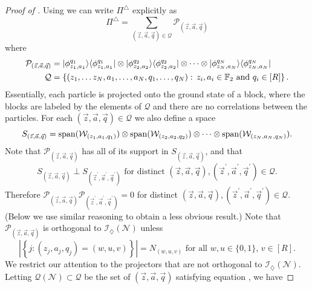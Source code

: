 \documentclass[../thesis-main/thesis-main]{subfiles}
\begin{document}
\begin{proof}[Proof of \protect{}]
Using  we can write $\Pi^{\triangle}$ explicitly as
\begin{equation}
\Pi^{\triangle}=\sum_{(\vec{z},\vec{a},\vec{q})\in\mathcal{Q}}\mathcal{P}_{(\vec{z},\vec{a},\vec{q})}\label{eq:Pi_N_triangle}
\end{equation}
where 
\begin{align}
  \mathcal{P}_{(\vec{z},\vec{a},\vec{q})} & =|\phi_{z_{1},a_{1}}^{q_{1}}\rangle\langle\phi_{z_{1},a_{1}}^{q_{1}}|\otimes|\phi_{z_{2},a_{2}}^{q_{2}}\rangle\langle\phi_{z_{2},a_{2}}^{q_{2}}|\otimes\cdots\otimes|\phi_{z_{N},a_{N}}^{q_{N}}\rangle\langle\phi_{z_{N},a_{N}}^{q_{N}}|\\
  \mathcal{Q} & =\left\{ (z_{1},\ldots z_{N},a_{1},\ldots,a_{N},q_{1},\ldots,q_{N}):\, z_{i},a_{i}\in\mathbb{F}_2\text{ and }q_{i}\in[R]\right\} .
\end{align}
Essentially, each particle is projected onto the ground state of a block, where the blocks are labeled by the elements of $\mathcal{Q}$ and there are no correlations between the particles.  For each $(\vec{z},\vec{a},\vec{q})\in\mathcal{Q}$ we also define a space 
\begin{equation}
  S_{(\vec{z},\vec{a},\vec{q})}=\operatorname{span}(\mathcal{W}_{(z_{1},a_{1},q_{1})})\otimes\operatorname{span}(\mathcal{W}_{(z_{2},a_{2},q_{2})})\otimes\cdots\otimes\operatorname{span}(\mathcal{W}_{(z_{N},a_{N},q_{N})}).
\end{equation}
Note that $\mathcal{P}_{(\vec{z},\vec{a},\vec{q})}$ has all of its support in $S_{(\vec{z},\vec{a},\vec{q})}$, and that
\begin{equation}
S_{(\vec{z},\vec{a},\vec{q})}\perp S_{(\vec{z}^{\prime},\vec{a}^{\prime},\vec{q}^{\prime})}\text{ for distinct }(\vec{z},\vec{a},\vec{q}),(\vec{z}^{\prime},\vec{a}^{\prime},\vec{q}^{\prime})\in\mathcal{Q}.\label{eq:perp_S}
\end{equation}
Therefore $\mathcal{P}_{(\vec{z},\vec{a},\vec{q})}\mathcal{P}_{(\vec{z}^{\prime},\vec{a}^{\prime},\vec{q}^{\prime})}=0$ for distinct $(\vec{z},\vec{a},\vec{q}),(\vec{z}^{\prime},\vec{a}^{\prime},\vec{q}^{\prime})\in\mathcal{Q}$. (Below we use similar reasoning to obtain a less obvious result.) Note that $\mathcal{P}_{(\vec{z},\vec{a},\vec{q})}$ is orthogonal to $\mathcal{I}_{\diamondsuit}(\mathcal{N})$ unless 
\begin{equation}
\left|\left\{ j:(z_{j},a_{j},q_{j})=(w,u,v)\right\} \right|=N_{(w,u,v)}\text{ for all }w,u\in\{0,1\},\, v\in[R].\label{eq:satisfy_occ_numbers}
\end{equation}
We restrict our attention to the projectors that are not orthogonal to $\mathcal{I}_{\diamondsuit}(\mathcal{N})$. Letting $\mathcal{Q}(\mathcal{N})\subset\mathcal{Q}$ be the set of $(\vec{z},\vec{a},\vec{q})$ satisfying equation , we have

\end{proof}
\end{document}
